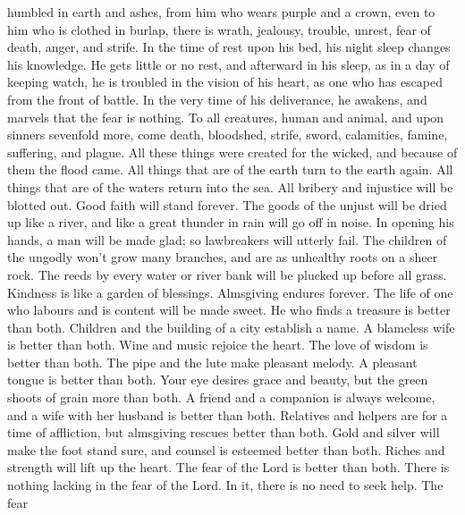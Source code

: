 humbled in earth and ashes,  from him who wears purple and a
crown, even to him who is clothed in burlap,  there is
wrath, jealousy, trouble, unrest, fear of death, anger, and strife. In
the time of rest upon his bed, his night sleep changes his knowledge.
 He gets little or no rest, and afterward in his sleep, as
in a day of keeping watch, he is troubled in the vision of his heart, as
one who has escaped from the front of battle.  In the very
time of his deliverance, he awakens, and marvels that the fear is
nothing.  To all creatures, human and animal, and upon
sinners sevenfold more,  come death, bloodshed, strife,
sword, calamities, famine, suffering, and plague.  All
these things were created for the wicked, and because of them the flood
came.  All things that are of the earth turn to the earth
again. All things that are of the waters return into the sea.
 All bribery and injustice will be blotted out. Good faith
will stand forever.  The goods of the unjust will be dried
up like a river, and like a great thunder in rain will go off in noise.
 In opening his hands, a man will be made glad; so
lawbreakers will utterly fail.  The children of the ungodly
won't grow many branches, and are as unhealthy roots on a sheer rock.
 The reeds by every water or river bank will be plucked up
before all grass.  Kindness is like a garden of blessings.
Almsgiving endures forever.  The life of one who labours
and is content will be made sweet. He who finds a treasure is better
than both.  Children and the building of a city establish a
name. A blameless wife is better than both.  Wine and music
rejoice the heart. The love of wisdom is better than both. 
The pipe and the lute make pleasant melody. A pleasant tongue is better
than both.  Your eye desires grace and beauty, but the
green shoots of grain more than both.  A friend and a
companion is always welcome, and a wife with her husband is better than
both.  Relatives and helpers are for a time of affliction,
but almsgiving rescues better than both.  Gold and silver
will make the foot stand sure, and counsel is esteemed better than both.
 Riches and strength will lift up the heart. The fear of
the Lord is better than both. There is nothing lacking in the fear of
the Lord. In it, there is no need to seek help.  The fear

